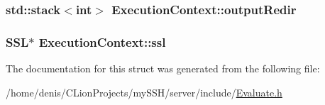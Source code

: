 \subsubsection[{\texorpdfstring{output\+Redir}{outputRedir}}]{\setlength{\rightskip}{0pt plus 5cm}std\+::stack$<$int$>$ Execution\+Context\+::output\+Redir}\hypertarget{structExecutionContext_a15af12d7e8146ae1a5f091b7d9919c8c}{}\label{structExecutionContext_a15af12d7e8146ae1a5f091b7d9919c8c}
\subsubsection[{\texorpdfstring{ssl}{ssl}}]{\setlength{\rightskip}{0pt plus 5cm}S\+SL$\ast$ Execution\+Context\+::ssl}\hypertarget{structExecutionContext_afce3bfa5f05214b9b0d57ac1edb0a0f4}{}\label{structExecutionContext_afce3bfa5f05214b9b0d57ac1edb0a0f4}


The documentation for this struct was generated from the following file\+:\begin{DoxyCompactItemize}
\item 
/home/denis/\+C\+Lion\+Projects/my\+S\+S\+H/server/include/\hyperlink{Evaluate_8h}{Evaluate.\+h}\end{DoxyCompactItemize}
